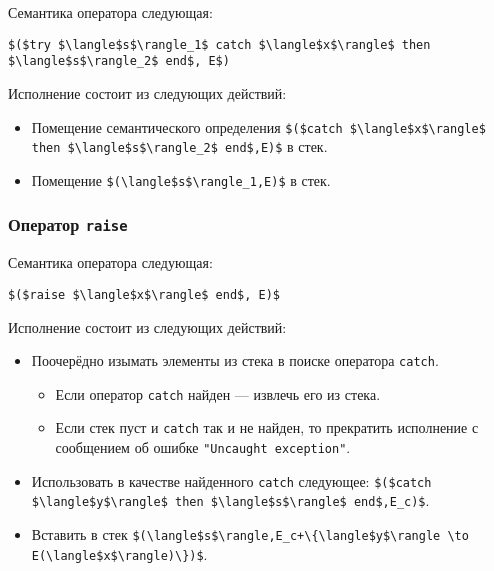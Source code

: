 Семантика оператора следующая:

\begin{lstlisting}
$($try $\langle$s$\rangle_1$ catch $\langle$x$\rangle$ then $\langle$s$\rangle_2$ end$, E$)
\end{lstlisting}

Исполнение состоит из следующих действий:

\begin{itemize}
\item{Помещение семантического определения \lstinline|$($catch $\langle$x$\rangle$ then $\langle$s$\rangle_2$ end$,E)$| в стек.}

\item{Помещение \lstinline|$(\langle$s$\rangle_1,E)$| в стек.}
\end{itemize}

\subsubsection{Оператор \lstinline|raise|}

Семантика оператора следующая:

\begin{lstlisting}
$($raise $\langle$x$\rangle$ end$, E)$
\end{lstlisting}

Исполнение состоит из следующих действий:

\begin{itemize}
\item{Поочерёдно изымать элементы из стека в поиске оператора \lstinline|catch|.

  \begin{itemize}
\item{Если оператор \lstinline|catch| найден --- извлечь его из стека.}

\item{Если стек пуст и \lstinline|catch| так и не найден, то прекратить исполнение с сообщением об ошибке \lstinline|"Uncaught exception"|.}
  \end{itemize}
}

\item{Использовать в качестве найденного \lstinline|catch| следующее: \lstinline|$($catch $\langle$y$\rangle$ then $\langle$s$\rangle$ end$,E_c)$|.}

\item{Вставить в стек \lstinline|$(\langle$s$\rangle,E_c+\{\langle$y$\rangle \to E(\langle$x$\rangle)\})$|.}
\end{itemize}

